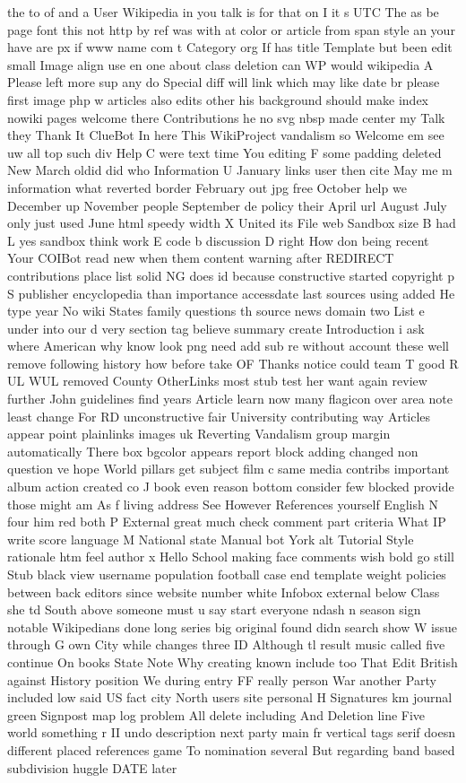 \documentclass[10pt,a4paper]{article}
\begin{document}
the to of and a User Wikipedia in you talk is for that on I it s UTC The as be page font this not http by ref was with at color or article from span style an your have are px if www name com t Category org If has title Template but been edit small Image align use en one about class deletion can WP would wikipedia A Please left more sup any do Special diff will link which may like date br please first image php w articles also edits other his background should make index nowiki pages welcome there Contributions he no svg nbsp made center my Talk they Thank It ClueBot In here This WikiProject vandalism so Welcome em see uw all top such div Help C were text time You editing F some padding deleted New March oldid did who Information U January links user then cite May me m information what reverted border February out jpg free October help we December up November people September de policy their April url August July only just used June html speedy width X United its File web Sandbox size B had L yes sandbox think work E code b discussion D right How don being recent Your COIBot read new when them content warning after REDIRECT contributions place list solid NG does id because constructive started copyright p S publisher encyclopedia than importance accessdate last sources using added He type year No wiki States family questions th source news domain two List e under into our d very section tag believe summary create Introduction i ask where American why know look png need add sub re without account these well remove following history how before take OF Thanks notice could team T good R UL WUL removed County OtherLinks most stub test her want again review further John guidelines find years Article learn now many flagicon over area note least change For RD unconstructive fair University contributing way Articles appear point plainlinks images uk Reverting Vandalism group margin automatically There box bgcolor appears report block adding changed non question ve hope World pillars get subject film c same media contribs important album action created co J book even reason bottom consider few blocked provide those might am As f living address See However References yourself English N four him red both P External great much check comment part criteria What IP write score language M National state Manual bot York alt Tutorial Style rationale htm feel author x Hello School making face comments wish bold go still Stub black view username population football case end template weight policies between back editors since website number white Infobox external below Class she td South above someone must u say start everyone ndash n season sign notable Wikipedians done long series big original found didn search show W issue through G own City while changes three ID Although tl result music called five continue On books State Note Why creating known include too That Edit British against History position We during entry FF really person War another Party included low said US fact city North users site personal H Signatures km journal green Signpost map log problem All delete including And Deletion line Five world something r II undo description next party main fr vertical tags serif doesn different placed references game To nomination several But regarding band based subdivision huggle DATE later 
\end{document}
